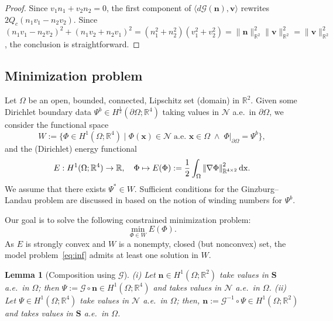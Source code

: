 \documentclass[a4paper,11pt]{article}
\newtheorem{lemma}[theorem]{Lemma}
\theoremstyle{definition}
\theoremstyle{remark}
\numberwithin{equation}{section}
\newcommand{\dx}{\,{\rm dx}}
\newcommand{\norm}[1]{{\lvert\kern-0.25ex \lvert #1 \rvert\kern-0.25ex \rvert}}
\newcommand{\Real}{\mathbb{R}}
\newcommand{\bn}{{\boldsymbol n}}
\newcommand{\bv}{{\boldsymbol v}}
\newcommand{\bx}{{\boldsymbol x}}
\newcommand{\bS}{{\boldsymbol S}}
\newcommand{\calG}{\mathcal{G}}
\newcommand{\calN}{\mathcal{N}}
\begin{document}
\begin{proof}
Since $v_1n_1+v_2n_2=0$, the first component of $\langle d\calG(\bn),\bv \rangle$
rewrites $2Q_c(n_1v_1-n_2v_2)$. Since $(n_1v_1-n_2v_2)^2+(n_1v_2+n_2v_1)^2=(n_1^2+n_2^2)(v_1^2+v_2^2) = \|\bn\|_{\Real^2}^2 \|\bv\|_{\Real^2}^2=\|\bv\|_{\Real^2}^2$, the conclusion is straightforward.
\end{proof}

\subsection{Minimization problem}

Let $\Omega$ be an open, bounded, connected, Lipschitz set (domain) in $\Real^2$. Given some Dirichlet boundary data $\Psi^b \in H^{\frac12}(\partial \Omega;\Real^4)$ taking values in $\calN$ a.e.~in $\partial\Omega$, we consider the functional space
\begin{equation}
W := \{\Phi \in H^1(\Omega;\Real^4)\;|\; \Phi(\bx)\in\calN \;\text{a.e.~$\bx\in\Omega$} \;\wedge \; \Phi|_{\partial\Omega}=\Psi^b\},
\end{equation}
and the (Dirichlet) energy functional
\begin{equation} \label{eq:def_E}
E : H^1(\Omega;\Real^4) \rightarrow \Real, \quad \Phi \mapsto E(\Phi) := \frac12 \int_\Omega \norm{\nabla \Phi}^2_{\Real^{4\times2}} \dx.
\end{equation}
We assume that there exists $\Psi^* \in W$.  Sufficient conditions for the Ginzburg--Landau problem are discussed in \cite{Bethuel} based on the notion of winding numbers for $\Psi^b.$

Our goal is to solve the following constrained minimization problem:
\begin{equation} \label{eq:inf}
\min_{\Phi \in W} E(\Phi).
\end{equation}
As $E$ is strongly convex and $W$ is a nonempty, closed (but nonconvex) set, the model problem~\eqref{eq:inf} admits at least one solution in $W$.

\begin{lemma}[Composition using $\calG$] \label{lem:compose}
\textup{(i)} Let $\bn\in H^1(\Omega;\Real^2)$ take values in $\bS$ a.e.~in $\Omega$; then $\Psi:=\calG \circ \bn \in H^1(\Omega;\Real^4)$ and takes values in $\calN$ a.e.~in $\Omega$.
\textup{(ii)} Let $\Psi \in H^1(\Omega;\Real^4)$ take values in $\calN$ a.e.~in $\Omega$; 
then, $\bn := \calG^{-1} \circ \Psi \in H^1(\Omega;\Real^2)$ and takes values in $\bS$ a.e.~in $\Omega$.
\end{lemma}
\end{document}
